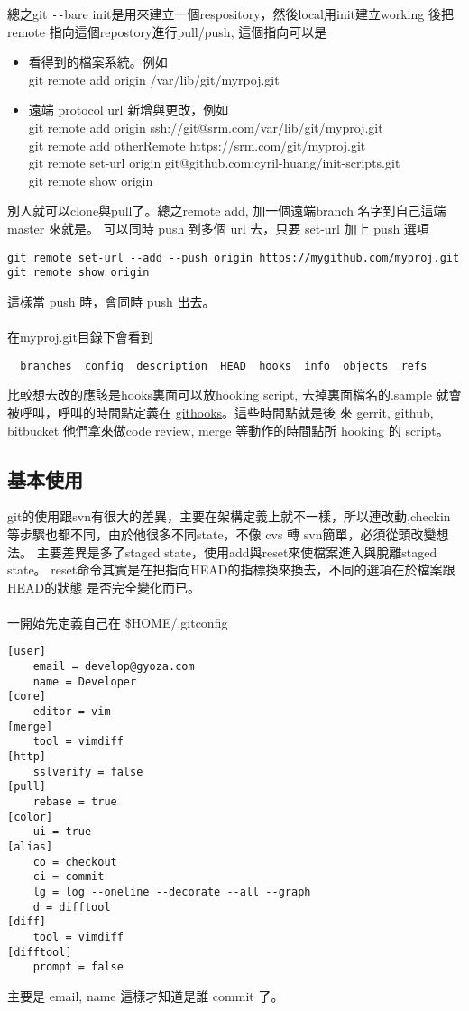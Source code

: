   總之git \verb=--=bare init是用來建立一個respository，然後local用init建立working
  後把remote 指向這個repostory進行pull/push, 這個指向可以是
  \begin{itemize}
    \item 看得到的檔案系統。例如\\
      git remote add origin /var/lib/git/myrpoj.git
    \item 遠端 protocol url 新增與更改，例如\\
      git remote add origin ssh://git@srm.com/var/lib/git/myproj.git\\
      git remote add otherRemote https://srm.com/git/myproj.git\\
      git remote set-url origin git@github.com:cyril-huang/init-scripts.git \\
      git remote show origin
  \end{itemize}
  別人就可以clone與pull了。總之remote add, 加一個遠端branch 名字到自己這端
  master 來就是。
  可以同時 push 到多個 url 去，只要 set-url 加上 push 選項
  \begin{verbatim}
git remote set-url --add --push origin https://mygithub.com/myproj.git
git remote show origin
  \end{verbatim}
  這樣當 push 時，會同時 push 出去。
  \\\\
  在myproj.git目錄下會看到
  \begin{verbatim}
  branches  config  description  HEAD  hooks  info  objects  refs
  \end{verbatim}
  比較想去改的應該是hooks裏面可以放hooking script, 去掉裏面檔名的.sample
  就會被呼叫，呼叫的時間點定義在
  \href{https://git-scm.com/docs/githooks}{githooks}。這些時間點就是後
  來 gerrit, github, bitbucket 他們拿來做code review, merge 等動作的時間點所
  hooking 的 script。
  \subsection{基本使用}
  git的使用跟svn有很大的差異，主要在架構定義上就不一樣，所以連改動,checkin
  等步驟也都不同，由於他很多不同state，不像 cvs 轉 svn簡單，必須從頭改變想法。
  主要差異是多了staged state，使用add與reset來使檔案進入與脫離staged state。
  reset命令其實是在把指向HEAD的指標換來換去，不同的選項在於檔案跟HEAD的狀態
  是否完全變化而已。
  \\\\
  一開始先定義自己在 \$HOME/.gitconfig
  \begin{verbatim}
[user]
	email = develop@gyoza.com
	name = Developer
[core]
	editor = vim
[merge]
	tool = vimdiff
[http]
	sslverify = false
[pull]
	rebase = true
[color]
	ui = true
[alias]
	co = checkout
	ci = commit
	lg = log --oneline --decorate --all --graph
	d = difftool
[diff]
	tool = vimdiff
[difftool]
	prompt = false
  \end{verbatim}
  主要是 email, name 這樣才知道是誰 commit 了。
